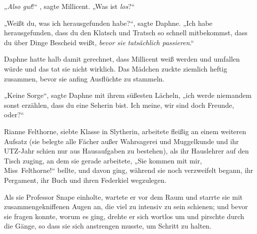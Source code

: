 „\emph{Also gut}!“ , sagte Millicent. „Was ist \emph{los}?“

„Weißt du, was ich herausgefunden habe?“, sagte Daphne. „Ich habe herausgefunden, dass du den Klatsch und Tratsch so schnell mitbekommst, dass du über Dinge Bescheid weißt, \emph{bevor sie tatsächlich passieren}.“

Daphne hatte halb damit gerechnet, dass Millicent weiß werden und umfallen würde und das tat sie nicht wirklich. Das Mädchen zuckte ziemlich heftig zusammen, bevor sie anfing Ausflüchte zu stammeln.

„Keine Sorge“, sagte Daphne mit ihrem süßesten Lächeln, „ich werde niemandem sonst erzählen, dass du eine Seherin bist. Ich meine, wir sind doch Freunde, oder?“

\later

Rianne Felthorne, siebte Klasse in Slytherin, arbeitete fleißig an einem weiteren Aufsatz (sie belegte alle Fächer außer Wahrsagerei und Muggelkunde und ihr UTZ-Jahr schien nur aus Hausaufgaben zu bestehen), als ihr Hauslehrer auf den Tisch zuging, an dem sie gerade arbeitete, „Sie kommen mit mir, Miss~Felthorne!“ bellte, und davon ging, während sie noch verzweifelt begann, ihr Pergament, ihr Buch und ihren Federkiel wegzulegen.

Als sie Professor Snape einholte, wartete er vor dem Raum und starrte sie mit zusammengekniffenen Augen an, die viel zu intensiv zu sein schienen; und bevor sie fragen konnte, worum es ging, drehte er sich wortlos um und pirschte durch die Gänge, so dass sie sich anstrengen musste, um Schritt zu halten.

